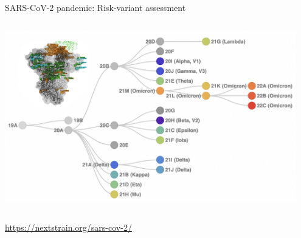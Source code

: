 \documentclass[10pt]{beamer}
\begin{document}
\begin{frame}{SARS-CoV-2 pandemic: Risk-variant assessment}
	\begin{columns}
		\column{\dimexpr\paperwidth-10pt}
		\begin{center}
			\includegraphics[width=0.95\textwidth]{./figures/nextstrain-sars-cov2-clades-merge.png}\par
		\end{center}
	\end{columns}
	\url{https://nextstrain.org/sars-cov-2/}
\end{frame}
\end{document}
